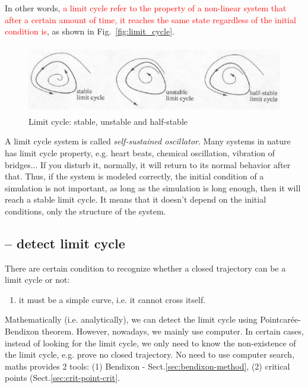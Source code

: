 In other words,
\textcolor{red}{a limit cycle refer to the property of a non-linear
  system that after a certain amount of time, it reaches the same
  state regardless of the initial condition is}, as shown in
  Fig.~\ref{fig:limit_cycle}.


\begin{figure}[hbt]
  \centerline{\includegraphics[height=3cm,
    angle=0]{./images/limit_cycle_3.eps}}
  \caption{Limit cycle: stable, unstable and half-stable}
  \label{fig:limit_cycle_3}
\end{figure}

A limit cycle system is called {\it self-sustained oscillator}. Many
systems in nature has limit cycle property, e.g. heart beats,
chemical oscillation, vibration of bridges... If you disturb it,
normally, it will return to its normal behavior after that. Thus, if
the system is modeled correctly, the initial condition of a simulation
is not important, as long as the simulation is long enough, then it
will reach a stable limit cycle. It means that it doesn't depend on
the initial conditions, only the structure of the system.

\subsection{-- detect limit cycle}

There are certain condition to recognize whether a closed trajectory
can be a limit cycle or not:

\begin{enumerate}
\item it must be a simple curve, i.e. it cannot cross itself.
\end{enumerate}

Mathematically (i.e. analytically), we can detect the limit cycle using
Pointcar\'ee-Bendixon theorem. However, nowadays, we mainly use
computer. In certain cases, instead of looking for the limit cycle, we
only need to know the non-existence of the limit cycle, e.g. prove no
closed trajectory. No need to use computer search, maths provides 2
tools: (1) Bendixon - Sect.\ref{sec:bendixon-method}, (2) critical points
(Sect.\ref{sec:crit-point-crit}.



